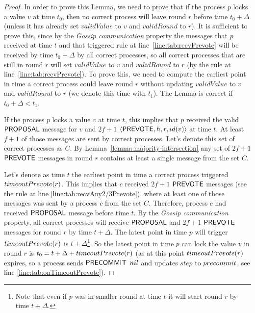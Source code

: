 \begin{proof} In order to prove this Lemma, we need to prove that if the
    process $p$ locks a value $v$ at time $t_0$, then no correct process will
    leave round $r$ before time $t_0 + \Delta$ (unless it has already set
    $validValue$ to $v$ and $validRound$ to $r$). It is sufficient to prove
    this, since by the \emph{Gossip communication} property the messages that
    $p$ received at time $t$ and that triggered rule at
    line~\ref{line:tab:recvPrevote} will be received by time $t_0 + \Delta$ by
    all correct processes, so all correct processes that are still in round $r$
    will set $validValue$ to $v$ and $validRound$ to $r$ (by the rule at
    line~\ref{line:tab:recvPrevote}). To prove this, we need to compute the
    earliest point in time a correct process could leave round $r$ without
    updating $validValue$ to $v$ and $validRound$ to $r$ (we denote this time
    with $t_1$). The Lemma is correct if $t_0 + \Delta < t_1$. 

If the process $p$ locks a value $v$ at time $t$, this implies that $p$
received the valid $\mathsf{PROPOSAL}$ message for $v$ and $2f+1$
$\langle\mathsf{PREVOTE},h,r,id(v)\rangle$ at time $t$. At least $f+1$ of those messages are
sent by correct processes. Let's denote this set of correct processes as $C$. By
Lemma~\ref{lemma:majority-intersection} any set of $2f+1$ $\mathsf{PREVOTE}$ messages
in round $r$ contains at least a single message from the set $C$. 

Let's denote as time $t$ the earliest point in time a correct process triggered
$timeoutPrevote(r)$. This implies that $c$ received $2f+1$ $\mathsf{PREVOTE}$ messages
(see the rule at line \ref{line:tab:recvAny2/3Prevote}), where at least one of
those messages was sent by a process $c$ from the set $C$.  Therefore, process
$c$ had received $\mathsf{PROPOSAL}$ message before time $t$. By the \emph{Gossip
communication} property, all correct processes will receive $\mathsf{PROPOSAL}$ and
$2f+1$ $\mathsf{PREVOTE}$ messages for round $r$ by time $t+\Delta$. The latest point
in time $p$ will trigger $timeoutPrevote(r)$ is $t+\Delta$\footnote{Note that
even if $p$ was in smaller round at time $t$ it will start round $r$ by time
$t+\Delta$.}.  So the latest point in time $p$ can lock the value $v$ in
round $r$ is $t_0 = t+\Delta+timeoutPrevote(r)$ (as at this point
$timeoutPrevote(r)$ expires, so a process sends $\mathsf{PRECOMMIT}$ $nil$ and updates
$step$ to $precommit$, see line \ref{line:tab:onTimeoutPrevote}).  


\end{proof}
